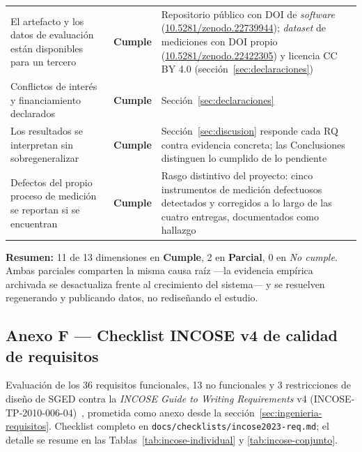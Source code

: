 \documentclass[11pt,a4paper]{article}
\newcommand{\ruta}[1]{\texttt{\footnotesize #1}}
\newcommand{\cumple}{\textcolor{okverde}{\textbf{Cumple}}}
\newcommand{\parcial}{\textcolor{alerta}{\textbf{Parcial}}}
\begin{document}
\begin{table}[htbp]
\begin{tabular}{@{}p{6.2cm}cp{6.8cm}@{}}
El artefacto y los datos de evaluación están disponibles para un tercero & \cumple & Repositorio público con DOI de \emph{software} (\href{https://doi.org/10.5281/zenodo.22739944}{10.5281/zenodo.22739944}); \emph{dataset} de mediciones con DOI propio (\href{https://doi.org/10.5281/zenodo.22422305}{10.5281/zenodo.22422305}) y licencia CC BY 4.0 (sección~\ref{sec:declaraciones}) \\
Conflictos de interés y financiamiento declarados & \cumple & Sección~\ref{sec:declaraciones} \\
Los resultados se interpretan sin sobregeneralizar & \cumple & Sección~\ref{sec:discusion} responde cada RQ contra evidencia concreta; las Conclusiones distinguen lo cumplido de lo pendiente \\
Defectos del propio proceso de medición se reportan si se encuentran & \cumple & Rasgo distintivo del proyecto: cinco instrumentos de medición defectuosos detectados y corregidos a lo largo de las cuatro entregas, documentados como hallazgo \\
\bottomrule
\end{tabular}
\end{table}

\textbf{Resumen:} 11 de 13 dimensiones en \cumple, 2 en \parcial, 0 en
\emph{No cumple}. Ambas parciales comparten la misma causa raíz —la
evidencia empírica archivada se desactualiza frente al crecimiento del
sistema— y se resuelven regenerando y publicando datos, no
rediseñando el estudio.

\subsection*{Anexo F --- Checklist INCOSE v4 de calidad de requisitos}

Evaluación de los 36 requisitos funcionales, 13 no funcionales y 3
restricciones de diseño de SGED contra la \emph{INCOSE Guide to
Writing Requirements} v4 (INCOSE-TP-2010-006-04)~\cite{incose2023},
prometida como anexo desde la sección~\ref{sec:ingenieria-requisitos}.
Checklist completo en \ruta{docs/checklists/incose2023-req.md}; el
detalle se resume en las Tablas~\ref{tab:incose-individual} y
\ref{tab:incose-conjunto}.
\end{document}
